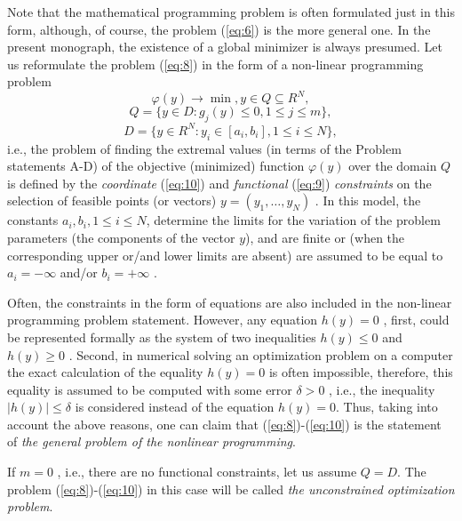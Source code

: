 Note that the mathematical programming problem is often formulated just in this form, although, of course, the problem (\ref{eq:6}) is the more general one.
In the present monograph, the existence of a global minimizer is always presumed. Let us reformulate the problem (\ref{eq:8}) in the form of a non-linear programming problem
\begin{equation}
\label{eq:8}
\varphi(y)\rightarrow\min, y \in Q\subseteq R^N,
\end{equation}
\begin{equation}
\label{eq:9}
Q=\{y \in D:g_j(y)\leq 0,1\leq j\leq m \},
\end{equation}
\begin{equation}
\label{eq:10}
D=\{y \in R^N:y_i\in [a_i,b_i],1\leq i\leq N \},
\end{equation}
i.e., the problem of finding the extremal values (in terms of the Problem statements A-D) of the objective (minimized) function $\varphi(y)$  over the domain $Q$ is defined by the \textit{coordinate} (\ref{eq:10}) and \textit{functional} (\ref{eq:9}) \textit{constraints} on the selection of feasible points (or vectors) $y=(y_1,\ldots ,y_N)$ . In this model, the constants $a_i,b_i, 1\leq i\leq N$,  determine the limits for the variation of the problem parameters (the components of the vector $y$), and are finite or (when the corresponding upper or/and lower limits are absent) are assumed to be equal to $a_i=-\infty $  and/or $b_i=+\infty $ .

Often, the constraints in the form of equations are also included in the non-linear programming problem statement. However, any equation $h(y)=0$ , first, could be represented formally as the system of two inequalities $h(y)\leq 0$  and $h(y)\geq 0$ . Second, in numerical solving an optimization problem on a computer the exact calculation of the equality $h(y)=0$ is often impossible, therefore, this equality is assumed to be computed  with some error $\delta>0$ , i.e., the inequality $\left|h(y)\right|\leq \delta$ is considered instead of the equation $h(y)=0$. Thus, taking into account the above reasons, one can claim that (\ref{eq:8})-(\ref{eq:10}) is the statement of  \textit {the general  problem of the nonlinear programming}.

If $m=0$ , i.e., there are no functional constraints, let us assume $Q=D$. The problem (\ref{eq:8})-(\ref{eq:10}) in this case will be called \textit {the unconstrained optimization problem}.

